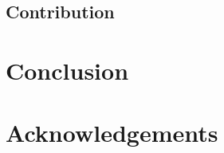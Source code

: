 \documentclass[10pt,twoside,a4paper,twocolumn,abstracton]{scrartcl}
\begin{document}
\subsection{Contribution}

\section{Conclusion}

\section{Acknowledgements}




\end{document}
